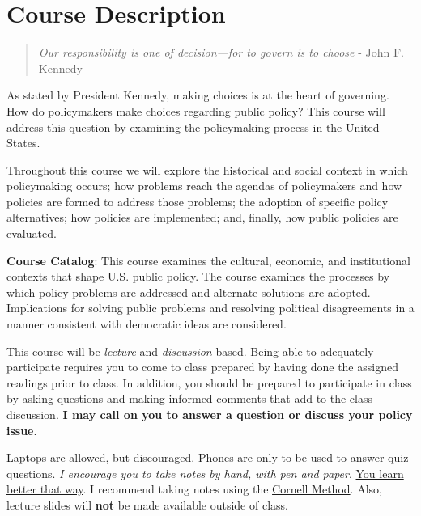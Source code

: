 \hypertarget{course-description}{%
\section{Course Description}\label{course-description}}

\begin{quote}
\emph{Our responsibility is one of decision---for to govern is to
choose} - John F. Kennedy
\end{quote}

\vspace{0.1in}

\noindent As stated by President Kennedy, making choices is at the heart
of governing. How do policymakers make choices regarding public policy?
This course will address this question by examining the policymaking
process in the United States.

\vspace{0.1in}

\noindent Throughout this course we will explore the historical and
social context in which policymaking occurs; how problems reach the
agendas of policymakers and how policies are formed to address those
problems; the adoption of specific policy alternatives; how policies are
implemented; and, finally, how public policies are evaluated.

\vspace{0.1in}

\noindent \textbf{Course Catalog}: This course examines the cultural,
economic, and institutional contexts that shape U.S. public policy. The
course examines the processes by which policy problems are addressed and
alternate solutions are adopted. Implications for solving public
problems and resolving political disagreements in a manner consistent
with democratic ideas are considered.

\vspace{0.1in}

\noindent This course will be \emph{lecture} and \emph{discussion}
based. Being able to adequately participate requires you to come to
class prepared by having done the assigned readings prior to class. In
addition, you should be prepared to participate in class by asking
questions and making informed comments that add to the class discussion.
\textbf{I may call on you to answer a question or discuss your policy
issue}.

\vspace{0.1in}

\noindent Laptops are allowed, but discouraged. Phones are only to be
used to answer quiz questions. \emph{I encourage you to take notes by
hand, with pen and paper}.
\href{https://www.nytimes.com/2017/11/27/learning/should-teachers-and-professors-ban-student-use-of-laptops-in-class.html}{You
learn better that way}. I recommend taking notes using the
\href{http://www.usu.edu/arc/idea_sheets/pdf/note_taking_cornell.pdf}{Cornell
Method}. Also, lecture slides will \textbf{not} be made available
outside of class.

